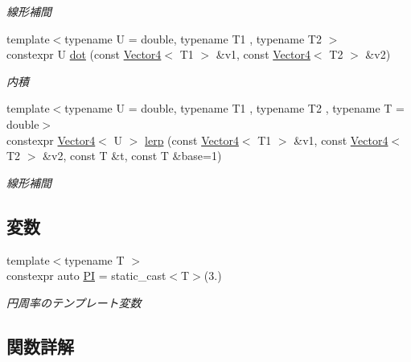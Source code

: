 \begin{DoxyCompactItemize}
\begin{DoxyCompactList}\small\item\em 線形補間 \end{DoxyCompactList}\item 
{\footnotesize template$<$typename U  = double, typename T1 , typename T2 $>$ }\\constexpr U \mbox{\hyperlink{namespacesaki_ad5009f6ca6c3f6c430fa9b8c889b6ee8}{dot}} (const \mbox{\hyperlink{classsaki_1_1_vector4}{Vector4}}$<$ T1 $>$ \&v1, const \mbox{\hyperlink{classsaki_1_1_vector4}{Vector4}}$<$ T2 $>$ \&v2)
\begin{DoxyCompactList}\small\item\em 内積 \end{DoxyCompactList}\item 
{\footnotesize template$<$typename U  = double, typename T1 , typename T2 , typename T  = double$>$ }\\constexpr \mbox{\hyperlink{classsaki_1_1_vector4}{Vector4}}$<$ U $>$ \mbox{\hyperlink{namespacesaki_a51c020b3332d053f9085912dcd724d98}{lerp}} (const \mbox{\hyperlink{classsaki_1_1_vector4}{Vector4}}$<$ T1 $>$ \&v1, const \mbox{\hyperlink{classsaki_1_1_vector4}{Vector4}}$<$ T2 $>$ \&v2, const T \&t, const T \&base=1)
\begin{DoxyCompactList}\small\item\em 線形補間 \end{DoxyCompactList}\end{DoxyCompactItemize}
\subsection*{変数}
\begin{DoxyCompactItemize}
\item 
{\footnotesize template$<$typename T $>$ }\\constexpr auto \mbox{\hyperlink{namespacesaki_a1e4c737224df004cb65f178577838f0c}{PI}} = static\+\_\+cast$<$T$>$(3.)
\begin{DoxyCompactList}\small\item\em 円周率のテンプレート変数 \end{DoxyCompactList}\end{DoxyCompactItemize}


\subsection{関数詳解}
\mbox{\label{namespacesaki_a012046e05c5909bb34ca3e609ca74ff3}} 
